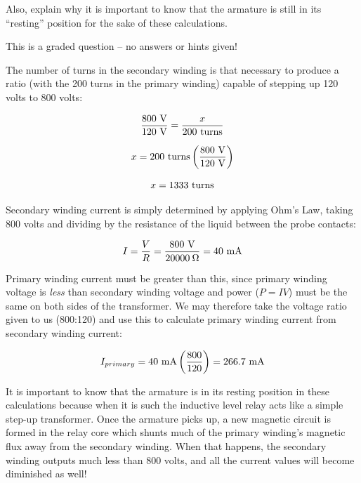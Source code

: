 Also, explain why it is important to know that the armature is still in its ``resting'' position for the sake of these calculations.

\vfil 

\eject






This is a graded question -- no answers or hints given!







The number of turns in the secondary winding is that necessary to produce a ratio (with the 200 turns in the primary winding) capable of stepping up 120 volts to 800 volts:

$${800 \hbox{ V} \over 120 \hbox{ V} } = {x \over 200 \hbox{ turns}}$$

$$x = 200 \hbox{ turns} \left( 800 \hbox{ V} \over 120 \hbox{ V} \right)$$

$$x = 1333 \hbox{ turns}$$

\vskip 10pt

Secondary winding current is simply determined by applying Ohm's Law, taking 800 volts and dividing by the resistance of the liquid between the probe contacts:

$$I = {V \over R} = {800 \hbox{ V} \over 20000 \> \Omega} = 40 \hbox{ mA}$$

\vskip 10pt

Primary winding current must be greater than this, since primary winding voltage is {\it less} than secondary winding voltage and power ($P = IV$) must be the same on both sides of the transformer.  We may therefore take the voltage ratio given to us (800:120) and use this to calculate primary winding current from secondary winding current:

$$I_{primary} = 40 \hbox{ mA} \left( 800 \over 120 \right) = 266.7 \hbox{ mA}$$

\vskip 10pt

It is important to know that the armature is in its resting position in these calculations because when it is such the inductive level relay acts like a simple step-up transformer.  Once the armature picks up, a new magnetic circuit is formed in the relay core which shunts much of the primary winding's magnetic flux away from the secondary winding.  When that happens, the secondary winding outputs much less than 800 volts, and all the current values will become diminished as well!




